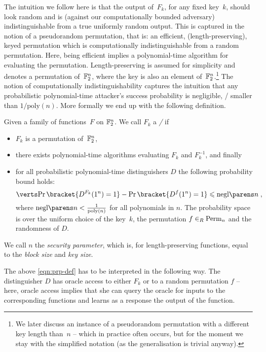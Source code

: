 The intuition we follow here is that the output of~$F_k$, for any fixed key~$k$, should look random and is (against our computationally bounded adversary) indistinguishable from a true uniformly random output.
This is captured in the notion of a pseudorandom permutation, that is: an efficient, (length-preserving), keyed permutation which is computationally indistinguishable from a random permutation.
Here, being efficient implies a polynomial-time algorithm for evaluating the permutation.
Length-preserving is assumed for simplicity and denotes a permutation of~$\mathbb{F}_2^n$, where the key is also an element of~$\mathbb{F}_2^n$.\footnote{%
    We later discuss an instance of a pseudorandom permutation with a different key length than~$n$ -- which in practice often occurs, but for the moment we stay with the simplified notation (as the generalisation is trivial anyway).
}
The notion of computationally indistinguishability captures the intuition that any probabilistic polynomial-time attacker's success probability is negligible, \ie/ smaller than $1/\mathrm{poly}(n)$.
More formally we end up with the following definition.
\begin{definition}\label{def:prp}
    Given a family of functions~$F$ on $\mathbb{F}_2^n$.
    We call $F_k$ a \emph{\PRP/} if
    \begin{itemize}
        \item $F_k$ is a permutation of~$\mathbb{F}_2^n$,
        \item there exists polynomial-time algorithms evaluating $F_k$ and $F_k^{-1}$, and finally
        \item for all probabilistic polynomial-time distinguishers $D$ the following probability bound holds:
              \begin{equation}\label{eqn:prp-def}
                  \abs{\Prob\bracket{D^{F_k}(1^n) = 1} - \Prob\bracket{D^{f}(1^n) = 1}} \leqslant \negl{n}\;,
              \end{equation}
              where $\negl{n} < \frac{1}{\mathrm{poly}(n)}$ for all polynomials in $n$.
              The probability space is over the uniform choice of the key~$k$, the permutation $f \in_R \perm/_n$ and the randomness of $D$.
    \end{itemize}
    We call $n$ the \emph{security parameter}, which is, for length-preserving functions, equal to the \emph{block size} and \emph{key size}.
\end{definition}
The above \cref{eqn:prp-def} has to be interpreted in the following way.
The distinguisher $D$ has oracle access to either $F_k$ or to a random permutation $f$ -- here, oracle access implies that she can query the oracle for inputs to the corresponding functions and learns as a response the output of the function.
